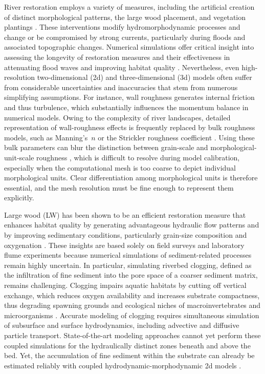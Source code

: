 \documentclass[draft,linenumbers,onecolumn]{agujournal2019} %
\begin{document}
River restoration employs a variety of measures, including the artificial creation of distinct morphological patterns, the large wood placement, and vegetation plantings \cite{schwindt2019hydromorphological, kail2007use, roni2015wood, grabowski2019current, neuhaus2021engineered}. These interventions modify hydromorphodynamic processes and change or be compromised by strong currents, particularly during floods and associated topographic changes. Numerical simulations offer critical insight into assessing the longevity of restoration measures and their effectiveness in attenuating flood waves and improving habitat quality \cite{schwindt2020river}. Nevertheless, even high-resolution two-dimensional (2d) and three-dimensional (3d) models often suffer from considerable uncertainties and inaccuracies that stem from numerous simplifying assumptions. For instance, wall roughness generates internal friction and thus turbulence, which substantially influences the momentum balance in numerical models. Owing to the complexity of river landscapes, detailed representation of wall-roughness effects is frequently replaced by bulk roughness models, such as Manning's~$n$ \cite{manning1891flow} or the Strickler roughness coefficient \cite{strickler1923beitrage, meyer-peter1948formulas}. Using these bulk parameters can blur the distinction between grain-scale and morphological-unit-scale roughness \cite{ferguson2007flow}, which is difficult to resolve during model calibration, especially when the computational mesh is too coarse to depict individual morphological units. Clear differentiation among morphological units is therefore essential, and the mesh resolution must be fine enough to represent them explicitly.

Large wood (LW) has been shown to be an efficient restoration measure that enhances habitat quality by generating advantageous hydraulic flow patterns \cite{follett2020momentum, schalko2024enhanced} and by improving sedimentary conditions, particularly grain-size composition and oxygenation \cite{schwindt2023fuzzylogic, schalko2024flow}. These insights are based solely on field surveys and laboratory flume experiments because numerical simulations of sediment-related processes remain highly uncertain. In particular, simulating riverbed clogging, defined as the infiltration of fine sediment into the pore space of a coarser sediment matrix, remains challenging. Clogging impairs aquatic habitats by cutting off vertical exchange, which reduces oxygen availability and increases substrate compactness, thus degrading spawning grounds and ecological niches of macroinvertebrates and microorganisms \cite{banscher1976gesetzmassigkeiten, brunke1997ecological, blaschke2003clogging}. Accurate modeling of clogging requires simultaneous simulation of subsurface and surface hydrodynamics, including advective and diffusive particle transport. State-of-the-art modeling approaches cannot yet perform these coupled simulations for the hydraulically distinct zones beneath and above the bed. Yet, the accumulation of fine sediment within the substrate can already be estimated reliably with coupled hydrodynamic-morphodynamic 2d models \cite{scolari2025hydromorphodynamic}.
\end{document}
